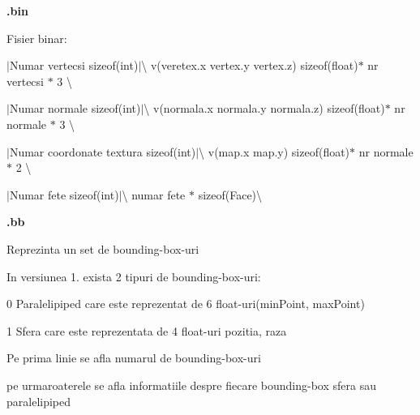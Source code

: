 {\bfseries .bin}\par
 Fisier binar\-:\par
 $|$\-Numar vertecsi sizeof(int)$|$\textbackslash{} v(veretex.\-x vertex.\-y vertex.\-z) sizeof(float)$\ast$ nr vertecsi $\ast$ 3 \textbackslash{}\par
 $|$\-Numar normale sizeof(int)$|$\textbackslash{} v(normala.\-x normala.\-y normala.\-z) sizeof(float)$\ast$ nr normale $\ast$ 3 \textbackslash{}\par
 $|$\-Numar coordonate textura sizeof(int)$|$\textbackslash{} v(map.\-x map.\-y) sizeof(float)$\ast$ nr normale $\ast$ 2 \textbackslash{}\par
 $|$\-Numar fete sizeof(int)$|$\textbackslash{} numar fete $\ast$ sizeof(\-Face)\textbackslash{}\par
 {\bfseries .bb}\par
 Reprezinta un set de bounding-\/box-\/uri\par
 In versiunea 1. exista 2 tipuri de bounding-\/box-\/uri\-:\par

\begin{DoxyItemize}
\item 0 Paralelipiped care este reprezentat de 6 float-\/uri(min\-Point, max\-Point)\par

\item 1 Sfera care este reprezentata de 4 float-\/uri pozitia, raza\par

\item Pe prima linie se afla numarul de bounding-\/box-\/uri\par
 pe urmaroaterele se afla informatiile despre fiecare bounding-\/box sfera sau paralelipiped\par
 
\end{DoxyItemize}
